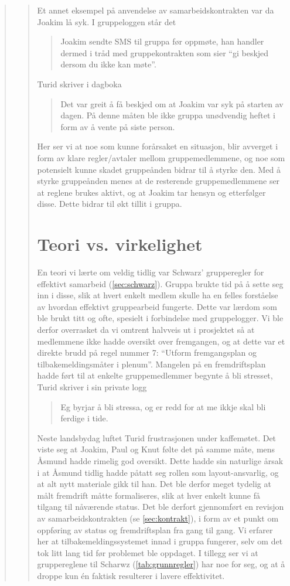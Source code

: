 \begin{quote}
\begin{quote}
Et annet eksempel på anvendelse av samarbeidskontrakten var da Joakim lå syk. I
gruppeloggen står det
\begin{quote}
Joakim sendte SMS til gruppa før oppmøte, han handler
dermed i tråd med gruppekontrakten som sier ``gi beskjed dersom du ikke kan
møte''.
\end{quote}
 Turid skriver i dagboka 
 \begin{quote}
 Det var greit å få beskjed om at Joakim var
syk på starten av dagen. På denne måten ble ikke gruppa unødvendig heftet i form
av å vente på siste person. 
\end{quote}
Her ser vi at noe som kunne forårsaket en situasjon, blir avverget i form av 
klare regler/avtaler mellom
gruppemedlemmene, og noe som potensielt kunne skadet gruppeånden bidrar til å
styrke den. Med å styrke gruppeånden menes at de resterende gruppemedlemmene ser
at reglene brukes aktivt, og at Joakim tar hensyn og etterfølger disse. Dette
bidrar til økt tillit i gruppa.

\section{Teori vs. virkelighet}
En teori vi lærte om veldig tidlig var Schwarz' grupperegler for effektivt
samarbeid (\cref{sec:schwarz}). Gruppa brukte tid på å sette seg inn i disse, slik at
hvert enkelt medlem skulle ha en felles forståelse av hvordan effektivt
gruppearbeid fungerte. Dette var lærdom som ble brukt titt og ofte, spesielt i
forbindelse med gruppelogger. Vi ble derfor overrasket da vi omtrent halvveis ut
i prosjektet så at medlemmene ikke hadde oversikt over fremgangen, og at dette var et
direkte brudd på regel nummer 7: ``Utform fremgangsplan og tilbakemeldingsmåter
i plenum''. Mangelen på en fremdriftsplan hadde ført til at enkelte
gruppemedlemmer begynte å bli stresset, Turid skriver i sin private logg 
\begin{quote}
Eg byrjar å bli stressa, og er redd for at me ikkje skal bli ferdige i tide.
\end{quote}

Neste landsbydag luftet Turid frustrasjonen under kaffemøtet. Det viste seg at
Joakim, Paul og Knut følte det på samme måte, mens Åsmund hadde rimelig god
oversikt. Dette hadde sin naturlige årsak i at Åsmund tidlig hadde påtatt seg
rollen som layout-ansvarlig, og at alt nytt materiale gikk til han. Det ble
derfor meget tydelig at målt fremdrift måtte formaliseres, slik at hver enkelt
kunne få tilgang til nåværende status. Det ble derfort gjennomført en revisjon
av samarbeidskontrakten (se \cref{sec:kontrakt}), i form av et punkt om oppføring av
status og fremdriftsplan fra gang til gang. Vi erfarer her at
tilbakemeldingssystemet innad i gruppa fungerer, selv om det tok litt lang tid
før problemet ble oppdaget. I tillegg ser vi at gruppereglene til Scharwz
(\cref{tab:grunnregler}) har noe for seg, og at å droppe kun én faktisk
resulterer i lavere effektivitet. 


\end{quote}
\end{quote}
